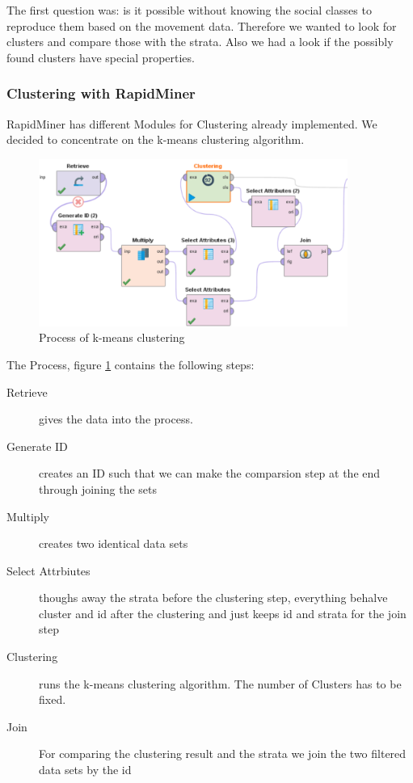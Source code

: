 The first question was: is it possible without knowing the social classes to reproduce them based on the movement data. Therefore we wanted to look for clusters and compare those with the strata. Also we had a look if the possibly found clusters have special properties.
\subsubsection{Clustering with RapidMiner}

RapidMiner has different Modules for Clustering already implemented. We decided to concentrate on the k-means clustering algorithm.
\begin{figure}[!htbp]
\centering
\includegraphics[width=0.9\textwidth]{ClusteringRapid.PNG}
\caption{Process of k-means clustering}
\label{fig: kclust}
\end{figure}


The Process, figure \ref{fig: kclust} contains the following steps:
\begin{description}
	\item[Retrieve] gives the data into the process. 
  \item[Generate ID] creates an ID such that we can make the comparsion step at the end through joining the sets
  \item[Multiply] creates two identical data sets
  \item[Select Attrbiutes] thoughs away the strata before the clustering step, everything behalve cluster and id after the clustering and just keeps id and strata for the join step
	\item[Clustering] runs the k-means clustering algorithm. The number of Clusters has to be fixed.
	\item[Join] For comparing the clustering result and the strata we join the two filtered data sets by the id
\end{description}

